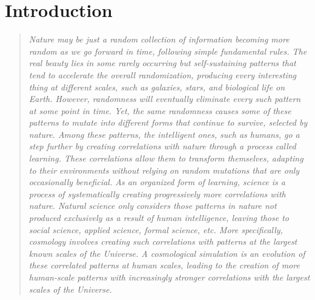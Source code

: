 \chapter{Introduction}
\label{chap:intro}

\begin{quote}
\textit{Nature may be just a random collection of information becoming more random as we go forward in time, following simple fundamental rules. The real beauty lies in some rarely occurring but self-sustaining patterns that tend to accelerate the overall randomization, producing every interesting thing at different scales, such as galaxies, stars, and biological life on Earth. However, randomness will eventually eliminate every such pattern at some point in time. Yet, the same randomness causes some of these patterns to mutate into different forms that continue to survive, selected by nature. Among these patterns, the intelligent ones, such as humans, go a step further by creating correlations with nature through a process called learning. These correlations allow them to transform themselves, adapting to their environments without relying on random mutations that are only occasionally beneficial. As an organized form of learning, science is a process of systematically creating progressively more correlations with nature. Natural science only considers those patterns in nature not produced exclusively as a result of human intelligence, leaving those to social science, applied science, formal science, etc. More specifically, cosmology involves creating such correlations with patterns at the largest known scales of the Universe. A cosmological simulation is an evolution of these correlated patterns at human scales, leading to the creation of more human-scale patterns with increasingly stronger correlations with the largest scales of the Universe.}

    
    
\end{quote}
    
